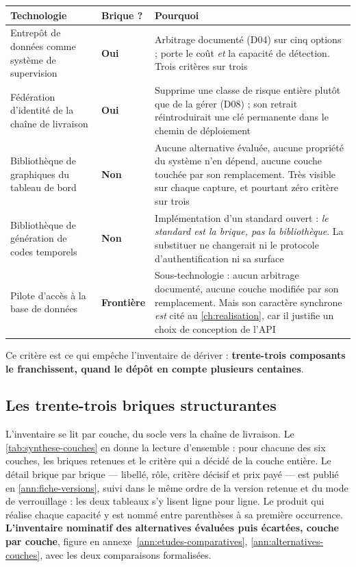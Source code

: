 \begingroup
\centering
{}
\label{tab:critere-application}
\scriptsize
\setlength{\tabcolsep}{3pt}
\begin{tabular}{|P{4.7cm}|P{2.0cm}|P{8.6cm}|}
\hline
\textbf{Technologie} & \textbf{Brique ?} & \textbf{Pourquoi} \\
\hline
Entrepôt de données comme système de supervision & \textbf{Oui} &
Arbitrage documenté (D04) sur cinq options ; porte le coût \emph{et} la capacité de détection.
Trois critères sur trois \\ \hline
Fédération d'identité de la chaîne de livraison & \textbf{Oui} &
Supprime une classe de risque entière plutôt que de la gérer (D08) ; son retrait réintroduirait une
clé permanente dans le chemin de déploiement \\ \hline
Bibliothèque de graphiques du tableau de bord & \textbf{Non} &
Aucune alternative évaluée, aucune propriété du système n'en dépend, aucune couche touchée par son
remplacement. Très visible sur chaque capture, et pourtant zéro critère sur trois \\ \hline
Bibliothèque de génération de codes temporels & \textbf{Non} &
Implémentation d'un standard ouvert : \emph{le standard est la brique, pas la bibliothèque}. La
substituer ne changerait ni le protocole d'authentification ni sa surface \\ \hline
Pilote d'accès à la base de données & \textbf{Frontière} &
Sous-technologie : aucun arbitrage documenté, aucune couche modifiée par son remplacement. Mais son
caractère synchrone \emph{est} cité au \cref{ch:realisation}, car il justifie un choix de
conception de l'API \\
\hline
\end{tabular}
\endgroup
\medskip

Ce critère est ce qui empêche l'inventaire de dériver : \textbf{trente-trois composants le
franchissent, quand le dépôt en compte plusieurs centaines}.

\subsection{Les trente-trois briques structurantes}
\label{sec:trente-trois-briques}

L'inventaire se lit par couche, du socle vers la chaîne de livraison. Le
\cref{tab:synthese-couches} en donne la lecture d'ensemble : pour chacune des six couches, les
briques retenues et le critère qui a décidé de la couche entière. Le détail brique par brique ---
libellé, rôle, critère décisif et prix payé --- est publié en \cref{ann:fiche-versions}, suivi
dans le même ordre de la version retenue et du mode de verrouillage : les deux tableaux s'y lisent
ligne pour ligne. Le produit qui réalise chaque capacité y est nommé entre parenthèses à sa
première occurrence. \textbf{L'inventaire nominatif des alternatives évaluées puis écartées,
couche par couche}, figure en annexe~\ref{ann:etudes-comparatives},
\cref{ann:alternatives-couches}, avec les deux comparaisons formalisées.

